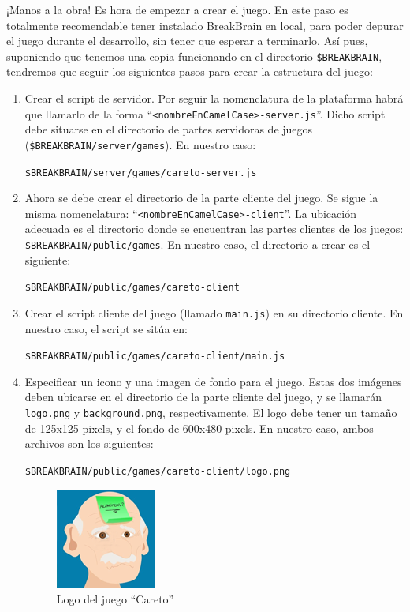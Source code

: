 ¡Manos a la obra! Es hora de empezar a crear el juego. En este paso es totalmente recomendable tener instalado BreakBrain en local, para poder depurar el juego durante el desarrollo, sin tener que esperar a terminarlo. Así pues, suponiendo que tenemos una copia funcionando en el directorio {\tt \$BREAKBRAIN}, tendremos que seguir los siguientes pasos para crear la estructura del juego:

\begin{enumerate}
\item Crear el script de servidor. Por seguir la nomenclatura de la plataforma habrá que llamarlo de la forma ``{\tt <nombreEnCamelCase>-server.js}''. Dicho script debe situarse en el directorio de partes servidoras de juegos ({\tt \$BREAKBRAIN/server/games}). En nuestro caso:
  \begin{center}
    {\tt \$BREAKBRAIN/server/games/careto-server.js}
  \end{center}

\item Ahora se debe crear el directorio de la parte cliente del juego. Se sigue la misma nomenclatura: ``{\tt <nombreEnCamelCase>-client}''. La ubicación adecuada es el directorio donde se encuentran las partes clientes de los juegos: {\tt \$BREAKBRAIN/public/games}. En nuestro caso, el directorio a crear es el siguiente:
  \begin{center}
    {\tt \$BREAKBRAIN/public/games/careto-client}
  \end{center}

\item Crear el script cliente del juego (llamado {\tt main.js}) en su directorio cliente. En nuestro caso, el script se sitúa en:
  \begin{center}
    {\tt \$BREAKBRAIN/public/games/careto-client/main.js}
  \end{center}

\item Especificar un icono y una imagen de fondo para el juego. Estas dos imágenes deben ubicarse en el directorio de la parte cliente del juego, y se llamarán {\tt logo.png} y {\tt background.png}, respectivamente. El logo debe tener un tamaño de 125x125 pixels, y el fondo de 600x480 pixels. En nuestro caso, ambos archivos son los siguientes:
  \begin{center}

    {\tt \$BREAKBRAIN/public/games/careto-client/logo.png}\\

    \begin{figure}[H]
      \begin{center}
        \includegraphics[scale=0.7]{images/careto-logo.png}
        \caption{Logo del juego ``Careto''}
      \end{center}
    \end{figure}


\end{center}
\end{enumerate}
